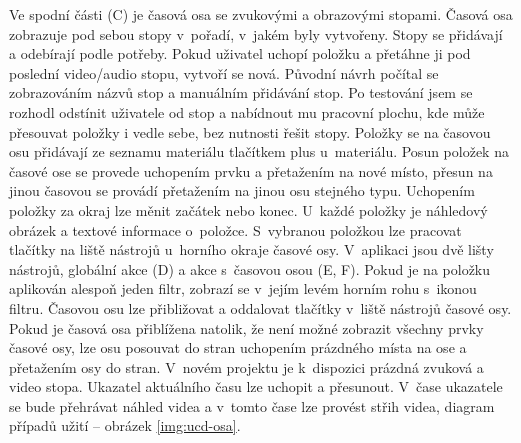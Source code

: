 Ve spodní části (C) je časová osa se zvukovými a obrazovými stopami. Časová osa zobrazuje pod sebou stopy v~pořadí, v~jakém byly vytvořeny. Stopy se přidávají a odebírají podle potřeby. Pokud uživatel uchopí položku a přetáhne ji pod poslední video/audio stopu, vytvoří se nová. Původní návrh počítal se zobrazováním názvů stop a manuálním přidávání stop. Po testování jsem se rozhodl odstínit uživatele od stop a nabídnout mu pracovní plochu, kde může přesouvat položky i vedle sebe, bez nutnosti řešit stopy. Položky se na časovou osu přidávají ze seznamu materiálu tlačítkem plus u~materiálu. Posun položek na časové ose se provede uchopením prvku a přetažením na nové místo, přesun na jinou časovou se provádí přetažením na jinou osu stejného typu. Uchopením položky za okraj lze měnit začátek nebo konec. U~každé položky je náhledový obrázek a textové informace o~položce. S~vybranou položkou lze pracovat tlačítky na liště nástrojů u~horního okraje časové osy. V~aplikaci jsou dvě lišty nástrojů, globální akce (D) a akce s~časovou osou (E, F). Pokud je na položku aplikován alespoň jeden filtr, zobrazí se v~jejím levém horním rohu  s~ikonou filtru. Časovou osu lze přibližovat a oddalovat tlačítky v~liště nástrojů časové osy. Pokud je časová osa přiblížena natolik, že není možné zobrazit všechny prvky časové osy, lze osu posouvat do stran uchopením prázdného místa na ose a přetažením osy do stran. V~novém projektu je k~dispozici prázdná zvuková a video stopa. Ukazatel aktuálního času lze uchopit a přesunout. V~čase ukazatele se bude přehrávat náhled videa a v~tomto čase lze provést střih videa, diagram případů užití -- obrázek \ref{img:ucd-osa}.
